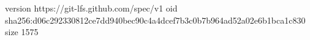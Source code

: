 version https://git-lfs.github.com/spec/v1
oid sha256:d06c292330812ce7dd940bec90c4a4dcef7b3c0b7b964ad52a02e6b1bca1c830
size 1575
